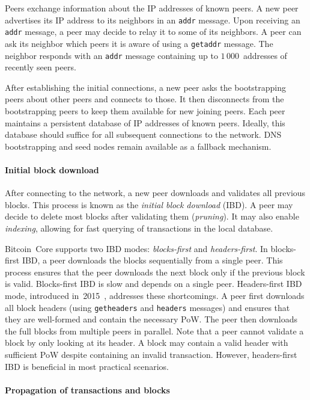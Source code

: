 Peers exchange information about the IP addresses of known peers.
A new peer advertises its IP address to its neighbors in an \texttt{addr} message.
Upon receiving an \texttt{addr} message, a peer may decide to relay it to some of its neighbors.
A peer can ask its neighbor which peers it is aware of using a \texttt{getaddr} message.
The neighbor responds with an \texttt{addr} message containing up to $1\,000$~addresses of recently seen peers.

After establishing the initial connections, a new peer asks the bootstrapping peers about other peers and connects to those.
It then disconnects from the bootstrapping peers to keep them available for new joining peers.
Each peer maintains a persistent database of IP addresses of known peers.
Ideally, this database should suffice for all subsequent connections to the network.
DNS bootstrapping and seed nodes remain available as a fallback mechanism.


\paragraph{Initial block download}

After connecting to the network, a new peer downloads and validates all previous blocks.
This process is known as the \textit{initial block download} (IBD).
A peer may decide to delete most blocks after validating them (\textit{pruning}).
It may also enable \textit{indexing}, allowing for fast querying of transactions in the local database.

Bitcoin~Core supports two IBD modes: \textit{blocks-first} and \textit{headers-first}.
In blocks-first IBD, a peer downloads the blocks sequentially from a single peer.
This process ensures that the peer downloads the next block only if the previous block is valid.
Blocks-first IBD is slow and depends on a single peer.
Headers-first IBD mode, introduced in~2015~\cite{Core2015}, addresses these shortcomings.
A peer first downloads all block headers (using \texttt{getheaders} and \texttt{headers} messages) and ensures that they are well-formed and contain the necessary PoW.
The peer then downloads the full blocks from multiple peers in parallel.
Note that a peer cannot validate a block by only looking at its header.
A block may contain a valid header with sufficient PoW despite containing an invalid transaction.
However, headers-first IBD is beneficial in most practical scenarios.


\paragraph{Propagation of transactions and blocks}

